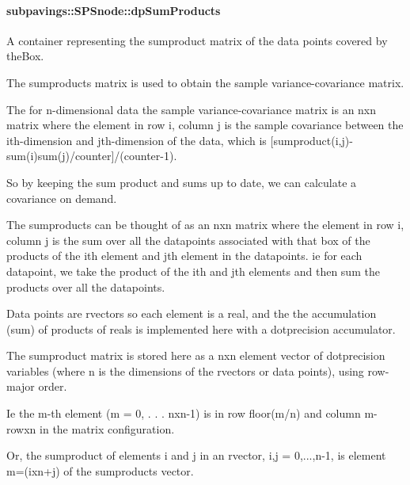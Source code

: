 \hypertarget{classsubpavings_1_1SPSnode_a7ff8f1c83a231af97c32808e0851dc78}{
\paragraph[{dp\-Sum\-Products}]{ {\bf subpavings\-::\-S\-P\-Snode\-::dp\-Sum\-Products}}}\label{classsubpavings_1_1SPSnode_a7ff8f1c83a231af97c32808e0851dc78}


\-A container representing the sumproduct matrix of the data points covered by the\-Box. 

\-The sumproducts matrix is used to obtain the sample variance-\/covariance matrix.

\-The for n-\/dimensional data the sample variance-\/covariance matrix is an nxn matrix where the element in row i, column j is the sample covariance between the ith-\/dimension and jth-\/dimension of the data, which is \mbox{[}sumproduct(i,j)-\/sum(i)sum(j)/counter\mbox{]}/(counter-\/1).

\-So by keeping the sum product and sums up to date, we can calculate a covariance on demand.

\-The sumproducts can be thought of as an nxn matrix where the element in row i, column j is the sum over all the datapoints associated with that box of the products of the ith element and jth element in the datapoints. ie for each datapoint, we take the product of the ith and jth elements and then sum the products over all the datapoints.

\-Data points are rvectors so each element is a real, and the the accumulation (sum) of products of reals is implemented here with a dotprecision accumulator.

\-The sumproduct matrix is stored here as a nxn element vector of dotprecision variables (where n is the dimensions of the rvectors or data points), using row-\/major order.

\-Ie the m-\/th element (m = 0, . . . nxn-\/1) is in row floor(m/n) and column m-\/rowxn in the matrix configuration.

\-Or, the sumproduct of elements i and j in an rvector, i,j = 0,...,n-\/1, is element m=(ixn+j) of the sumproducts vector. 

